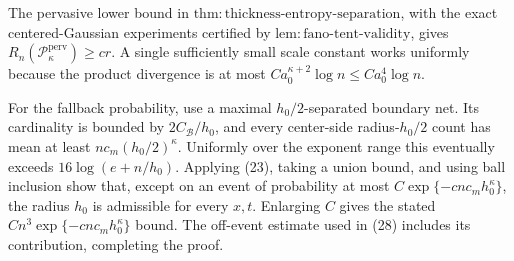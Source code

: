 The pervasive lower bound in \(\mathrm{thm:thickness\text{-}entropy\text{-}separation}\), with the exact centered-Gaussian experiments certified by \(\mathrm{lem:fano\text{-}tent\text{-}validity}\), gives \(R_n(\mathcal P_\kappa^{\mathrm{perv}})\ge cr\).  A single sufficiently small scale constant works uniformly because the product divergence is at most \(Ca_0^{\kappa+2}\log n\le Ca_0^4\log n\).

For the fallback probability, use a maximal \(h_0/2\)-separated boundary net.  Its cardinality is bounded by \(2C_{\mathcal B}/h_0\), and every center-side radius-\(h_0/2\) count has mean at least \(nc_m(h_0/2)^\kappa\).  Uniformly over the exponent range this eventually exceeds \(16\log(e+n/h_0)\).  Applying (23), taking a union bound, and using ball inclusion show that, except on an event of probability at most \(C\exp\{-cnc_mh_0^\kappa\}\), the radius \(h_0\) is admissible for every \(x,t\).  Enlarging \(C\) gives the stated \(Cn^3\exp\{-cnc_mh_0^\kappa\}\) bound.  The off-event estimate used in (28) includes its contribution, completing the proof.